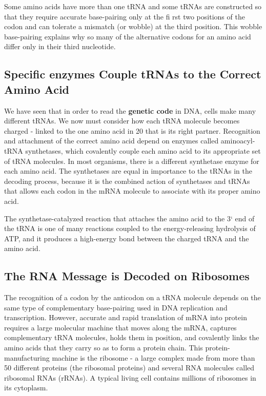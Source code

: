 Some amino acids have more than one tRNA and some tRNAs are constructed so that
they require accurate base-pairing only at the fi rst two positions of the
codon and can tolerate a mismatch (or wobble) at the third position. This
wobble base-pairing explains why so many of the alternative codons
for an amino acid differ only in their third nucleotide.

\subsection{Specific enzymes Couple tRNAs to the Correct Amino Acid}

We have seen that in order to read the \textbf{genetic code} in DNA, cells make
many different tRNAs. We now must consider how each tRNA molecule
becomes charged - linked to the one amino acid in 20 that is its right partner.
Recognition and attachment of the correct amino acid depend on
enzymes called aminoacyl-tRNA synthetases, which covalently couple
each amino acid to its appropriate set of tRNA molecules. In most organisms,
there is a different synthetase enzyme for each amino acid. The
synthetases are equal in importance to the tRNAs in the decoding process,
because it is the combined action of synthetases and tRNAs that
allows each codon in the mRNA molecule to associate with its proper
amino acid.

The synthetase-catalyzed reaction that attaches the amino acid to the 3`
end of the tRNA is one of many reactions coupled to the energy-releasing
hydrolysis of ATP, and it produces a high-energy bond
between the charged tRNA and the amino acid.

\subsection{The RNA Message is Decoded on Ribosomes}

The recognition of a codon by the anticodon on a tRNA molecule depends
on the same type of complementary base-pairing used in DNA replication
and transcription. However, accurate and rapid translation of mRNA
into protein requires a large molecular machine that moves along the
mRNA, captures complementary tRNA molecules, holds them in position,
and covalently links the amino acids that they carry so as to form a
protein chain. This protein-manufacturing machine is the ribosome - a
large complex made from more than 50 different proteins (the ribosomal
proteins) and several RNA molecules called ribosomal RNAs (rRNAs). A
typical living cell contains millions of ribosomes in its cytoplasm.

